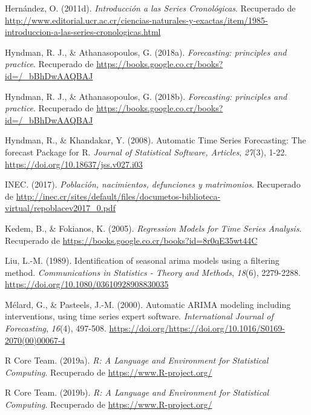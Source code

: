 \documentclass[]{article}
\begin{document}
\leavevmode\hypertarget{ref-oscarh-4}{}%
Hernández, O. (2011d). \emph{Introducción a las Series Cronológicas}.
Recuperado de
\url{http://www.editorial.ucr.ac.cr/ciencias-naturales-y-exactas/item/1985-introduccion-a-las-series-cronologicas.html}

\leavevmode\hypertarget{ref-hyndman2018forecasting}{}%
Hyndman, R. J., \& Athanasopoulos, G. (2018a). \emph{Forecasting:
principles and practice}. Recuperado de
\url{https://books.google.co.cr/books?id=/_bBhDwAAQBAJ}

\leavevmode\hypertarget{ref-hyndman_box-jenkins}{}%
Hyndman, R. J., \& Athanasopoulos, G. (2018b). \emph{Forecasting:
principles and practice}. Recuperado de
\url{https://books.google.co.cr/books?id=/_bBhDwAAQBAJ}

\leavevmode\hypertarget{ref-auto.arima}{}%
Hyndman, R., \& Khandakar, Y. (2008). Automatic Time Series Forecasting:
The forecast Package for R. \emph{Journal of Statistical Software,
Articles}, \emph{27}(3), 1-22.
\url{https://doi.org/10.18637/jss.v027.i03}

\leavevmode\hypertarget{ref-calidad_vitales}{}%
INEC. (2017). \emph{Población, nacimientos, defunciones y matrimonios}.
Recuperado de
\url{http://inec.cr/sites/default/files/documetos-biblioteca-virtual/repoblacev2017_0.pdf}

\leavevmode\hypertarget{ref-kedem}{}%
Kedem, B., \& Fokianos, K. (2005). \emph{Regression Models for Time
Series Analysis}. Recuperado de
\url{https://books.google.co.cr/books?id=8r0qE35wt44C}

\leavevmode\hypertarget{ref-liu}{}%
Liu, L.-M. (1989). Identification of seasonal arima models using a
filtering method. \emph{Communications in Statistics - Theory and
Methods}, \emph{18}(6), 2279-2288.
\url{https://doi.org/10.1080/03610928908830035}

\leavevmode\hypertarget{ref-melard}{}%
Mélard, G., \& Pasteels, J.-M. (2000). Automatic ARIMA modeling
including interventions, using time series expert software.
\emph{International Journal of Forecasting}, \emph{16}(4), 497-508.
\url{https://doi.org/https://doi.org/10.1016/S0169-2070(00)00067-4}

\leavevmode\hypertarget{ref-Rbase}{}%
R Core Team. (2019a). \emph{R: A Language and Environment for
Statistical Computing}. Recuperado de \url{https://www.R-project.org/}

\leavevmode\hypertarget{ref-parallel}{}%
R Core Team. (2019b). \emph{R: A Language and Environment for
Statistical Computing}. Recuperado de \url{https://www.R-project.org/}
\end{document}
